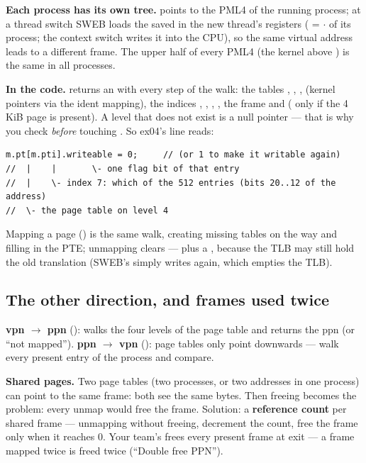 \documentclass[11pt]{report}
\begin{document}
\textbf{Each process has its own tree.}  points to the PML4 of the running process; at a
thread switch SWEB loads the  saved in the new thread's registers ( =
 $\cdot$  of its process; the context switch writes it into the CPU), so the same
virtual address leads to a different frame. The upper half of every PML4 (the kernel above
) is the same in all processes.

\textbf{In the code.}  returns an  with every step of
the walk: the tables , , ,  (kernel pointers via the ident
mapping), the indices , , , , the frame
 and  ( only if the 4\,KiB page is present). A level
that does not exist is a null pointer --- that is why you check  \emph{before} touching
. So ex04's line reads:
\begin{lstlisting}[style=cpp]
m.pt[m.pti].writeable = 0;     // (or 1 to make it writable again)
//  |    |       \- one flag bit of that entry
//  |    \- index 7: which of the 512 entries (bits 20..12 of the address)
//  \- the page table on level 4
\end{lstlisting}
Mapping a page () is the same walk, creating missing tables on the way and filling in
the PTE; unmapping clears  --- plus a , because the TLB may still hold
the old translation (SWEB's  simply writes  again, which empties the TLB).

\subsection*{The other direction, and frames used twice}

\textbf{vpn $\to$ ppn} ():  walks the four levels of the page
table and returns the ppn (or ``not mapped''). \textbf{ppn $\to$ vpn} (): page tables
only point downwards --- walk every present entry of the process and compare.

\textbf{Shared pages.} Two page tables (two processes, or two addresses in one process) can point to
the same frame: both see the same bytes. Then freeing becomes the problem: every unmap would free
the frame. Solution: a \textbf{reference count} per shared frame --- unmapping without freeing,
decrement the count, free the frame only when it reaches 0. Your team's 
frees every present frame at exit --- a frame mapped twice is freed twice (``Double free PPN'').
\end{document}

